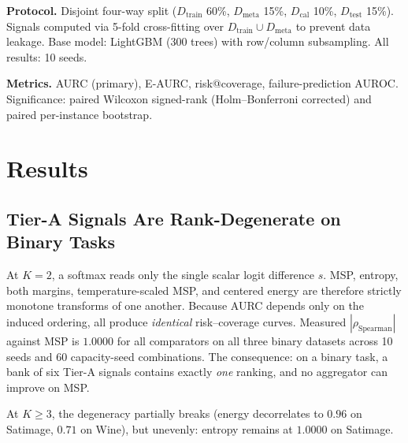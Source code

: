 \documentclass[conference]{IEEEtran}
\begin{document}
\textbf{Protocol.} Disjoint four-way split ($D_{\mathrm{train}}$ 60\%, $D_{\mathrm{meta}}$ 15\%, $D_{\mathrm{cal}}$ 10\%, $D_{\mathrm{test}}$ 15\%). Signals computed via 5-fold cross-fitting over $D_{\mathrm{train}} \cup D_{\mathrm{meta}}$ to prevent data leakage. Base model: LightGBM (300 trees) with row/column subsampling. All results: 10 seeds.

\textbf{Metrics.} AURC (primary), E-AURC, risk@coverage, failure-prediction AUROC. Significance: paired Wilcoxon signed-rank (Holm--Bonferroni corrected) and paired per-instance bootstrap.

\section{Results}
\label{sec:results}

\subsection{Tier-A Signals Are Rank-Degenerate on Binary Tasks}
\label{sec:degeneracy}

At $K{=}2$, a softmax reads only the single scalar logit difference $s$. MSP, entropy, both margins, temperature-scaled MSP, and centered energy are therefore strictly monotone transforms of one another. Because AURC depends only on the induced ordering, all produce \emph{identical} risk--coverage curves. Measured $|\rho_{\mathrm{Spearman}}|$ against MSP is $1.0000$ for all comparators on all three binary datasets across 10 seeds and 60 capacity-seed combinations. The consequence: on a binary task, a bank of six Tier-A signals contains exactly \emph{one} ranking, and no aggregator can improve on MSP.

At $K \ge 3$, the degeneracy partially breaks (energy decorrelates to $0.96$ on Satimage, $0.71$ on Wine), but unevenly: entropy remains at $1.0000$ on Satimage.
\end{document}
